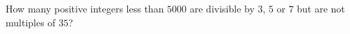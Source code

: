 How many positive integers less than $5000$ are divisible by $3$, $5$ or $7$ but are not multiples of $35$?
